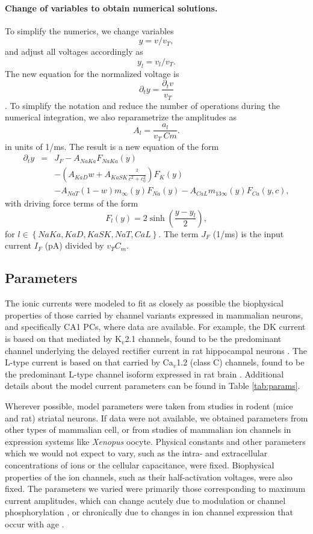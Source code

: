 \documentclass[10pt]{article}
\begin{document}
\paragraph{Change of variables to obtain numerical solutions.}
To simplify the numerics, we change variables $$y = v/v_T,$$ and adjust all voltages accordingly as $$y_l = v_l/v_T.$$ The new equation for the normalized voltage is $$\partial_t y = \frac{\partial_t v}{v_T}$$.
To simplify the notation and reduce the number of operations during the numerical integration, we also reparametrize the amplitudes as $$A_l = \frac{a_l}{v_T~Cm}.$$ in units of 1/ms. The result is a new equation of the form
\begin{eqnarray}
\partial_t y &=& J_F-A_{NaKa}F_{NaKa}(y) \\
&&- \left(A_{KaD}w + A_{KaSK}\frac{^2}{c^2 + c_0^2}\right)F_{K}(y) \\
&& - A_{NaT}(1-w)m_{\infty}(y) F_{Na}(y) - A_{CaL}m_{13\infty}(y)F_{Ca}(y,c),
\end{eqnarray}
with driving force terms of the form
$$F_l(y) = 2 \sinh\left(\frac{y-y_l}{2}\right),$$ 
for  $l \in \left\{NaKa,KaD,KaSK,NaT,CaL \right\}$.
The term $J_{F}$ (1/ms) is the input current $I_F$ (pA) divided by $v_T C_m$.


\subsection{Parameters}

The ionic currents were modeled to fit as closely as possible the biophysical properties of those carried by channel variants expressed in mammalian neurons, and specifically CA1 PCs, where data are available. For example, the DK current is based on that mediated by  K$_v$2.1 channels, found to be the predominant channel underlying the delayed rectifier current in rat hippocampal neurons \cite{murakoshi1999identification}. The L-type {\calcium} current is based on that carried by Ca$_v$1.2 (class C) channels, found to be the predominant L-type channel isoform expressed in rat brain \cite{hell1993identification}. Additional details about the model current parameters can be found in Table \ref{tab:params}.

Wherever possible, model parameters were taken from studies in rodent (mice and rat) striatal neurons. If data were not available, we obtained parameters from other types of mammalian cell, or from studies of mammalian ion channels in expression systems like \textit{Xenopus} oocyte. Physical constants and other parameters which we would not expect to vary, such as the intra- and extracellular concentrations of ions or the cellular capacitance, were fixed. Biophysical properties of the ion channels, such as their half-activation voltages, were also fixed. The parameters we varied were primarily those corresponding to maximum current amplitudes, which can change acutely due to modulation or channel phosphorylation \citep{li1992functional,fadool1998modulation}, or chronically due to changes in ion channel expression that occur with age \citep{greer2018whole,herman1998up,veng2002regionally}. 
\end{document}
